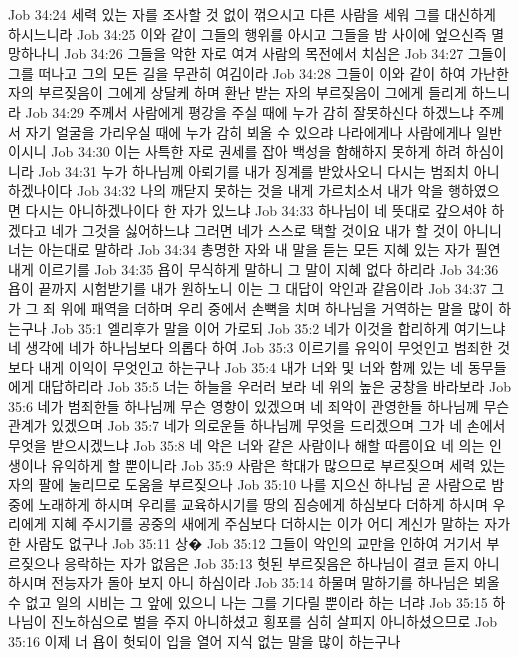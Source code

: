 Job 34:24  세력 있는 자를 조사할 것 없이 꺾으시고 다른 사람을 세워 그를 대신하게 하시느니라
Job 34:25  이와 같이 그들의 행위를 아시고 그들을 밤 사이에 엎으신즉 멸망하나니
Job 34:26  그들을 악한 자로 여겨 사람의 목전에서 치심은
Job 34:27  그들이 그를 떠나고 그의 모든 길을 무관히 여김이라
Job 34:28  그들이 이와 같이 하여 가난한 자의 부르짖음이 그에게 상달케 하며 환난 받는 자의 부르짖음이 그에게 들리게 하느니라
Job 34:29  주께서 사람에게 평강을 주실 때에 누가 감히 잘못하신다 하겠느냐 주께서 자기 얼굴을 가리우실 때에 누가 감히 뵈올 수 있으랴 나라에게나 사람에게나 일반이시니
Job 34:30  이는 사특한 자로 권세를 잡아 백성을 함해하지 못하게 하려 하심이니라
Job 34:31  누가 하나님께 아뢰기를 내가 징계를 받았사오니 다시는 범죄치 아니하겠나이다
Job 34:32  나의 깨닫지 못하는 것을 내게 가르치소서 내가 악을 행하였으면 다시는 아니하겠나이다 한 자가 있느냐
Job 34:33  하나님이 네 뜻대로 갚으셔야 하겠다고 네가 그것을 싫어하느냐 그러면 네가 스스로 택할 것이요 내가 할 것이 아니니 너는 아는대로 말하라
Job 34:34  총명한 자와 내 말을 듣는 모든 지혜 있는 자가 필연 내게 이르기를
Job 34:35  욥이 무식하게 말하니 그 말이 지혜 없다 하리라
Job 34:36  욥이 끝까지 시험받기를 내가 원하노니 이는 그 대답이 악인과 같음이라
Job 34:37  그가 그 죄 위에 패역을 더하며 우리 중에서 손뼉을 치며 하나님을 거역하는 말을 많이 하는구나
Job 35:1  엘리후가 말을 이어 가로되
Job 35:2  네가 이것을 합리하게 여기느냐 네 생각에 네가 하나님보다 의롭다 하여
Job 35:3  이르기를 유익이 무엇인고 범죄한 것보다 내게 이익이 무엇인고 하는구나
Job 35:4  내가 너와 및 너와 함께 있는 네 동무들에게 대답하리라
Job 35:5  너는 하늘을 우러러 보라 네 위의 높은 궁창을 바라보라
Job 35:6  네가 범죄한들 하나님께 무슨 영향이 있겠으며 네 죄악이 관영한들 하나님께 무슨 관계가 있겠으며
Job 35:7  네가 의로운들 하나님께 무엇을 드리겠으며 그가 네 손에서 무엇을 받으시겠느냐
Job 35:8  네 악은 너와 같은 사람이나 해할 따름이요 네 의는 인생이나 유익하게 할 뿐이니라
Job 35:9  사람은 학대가 많으므로 부르짖으며 세력 있는 자의 팔에 눌리므로 도움을 부르짖으나
Job 35:10  나를 지으신 하나님 곧 사람으로 밤중에 노래하게 하시며 우리를 교육하시기를 땅의 짐승에게 하심보다 더하게 하시며 우리에게 지혜 주시기를 공중의 새에게 주심보다 더하시는 이가 어디 계신가 말하는 자가 한 사람도 없구나
Job 35:11  상�
Job 35:12  그들이 악인의 교만을 인하여 거기서 부르짖으나 응락하는 자가 없음은
Job 35:13  헛된 부르짖음은 하나님이 결코 듣지 아니하시며 전능자가 돌아 보지 아니 하심이라
Job 35:14  하물며 말하기를 하나님은 뵈올 수 없고 일의 시비는 그 앞에 있으니 나는 그를 기다릴 뿐이라 하는 너랴
Job 35:15  하나님이 진노하심으로 벌을 주지 아니하셨고 횡포를 심히 살피지 아니하셨으므로
Job 35:16  이제 너 욥이 헛되이 입을 열어 지식 없는 말을 많이 하는구나
